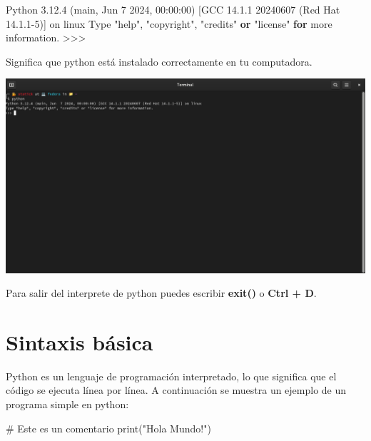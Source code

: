 \documentclass[
  a4paper,
  DIV=11,
  numbers=noendperiod,
  onepage,
  openany]{scrreprt}
\newenvironment{Shaded}{\begin{snugshade}}{\end{snugshade}}
\newcommand{\BuiltInTok}[1]{\textcolor[rgb]{0.00,0.23,0.31}{#1}}
\newcommand{\CommentTok}[1]{\textcolor[rgb]{0.37,0.37,0.37}{#1}}
\newcommand{\ControlFlowTok}[1]{\textcolor[rgb]{0.00,0.23,0.31}{\textbf{#1}}}
\newcommand{\DecValTok}[1]{\textcolor[rgb]{0.68,0.00,0.00}{#1}}
\newcommand{\FloatTok}[1]{\textcolor[rgb]{0.68,0.00,0.00}{#1}}
\newcommand{\KeywordTok}[1]{\textcolor[rgb]{0.00,0.23,0.31}{\textbf{#1}}}
\newcommand{\NormalTok}[1]{\textcolor[rgb]{0.00,0.23,0.31}{#1}}
\newcommand{\OperatorTok}[1]{\textcolor[rgb]{0.37,0.37,0.37}{#1}}
\newcommand{\StringTok}[1]{\textcolor[rgb]{0.13,0.47,0.30}{#1}}
\begin{document}
\begin{Shaded}
\begin{Highlighting}[]
\NormalTok{Python }\FloatTok{3.12.4}\NormalTok{ (main, Jun  }\DecValTok{7} \DecValTok{2024}\NormalTok{, }\DecValTok{00}\NormalTok{:}\DecValTok{00}\NormalTok{:}\DecValTok{00}\NormalTok{) [GCC }\FloatTok{14.1.1} \DecValTok{20240607}\NormalTok{ (Red Hat }\FloatTok{14.1.1}\OperatorTok{{-}}\DecValTok{5}\NormalTok{)] on linux}
\NormalTok{Type }\StringTok{"help"}\NormalTok{, }\StringTok{"copyright"}\NormalTok{, }\StringTok{"credits"} \KeywordTok{or} \StringTok{"license"} \ControlFlowTok{for}\NormalTok{ more information.}
\OperatorTok{\textgreater{}\textgreater{}\textgreater{}}
\end{Highlighting}
\end{Shaded}

Significa que python está instalado correctamente en tu computadora.

\includegraphics{unidades/unidad1/images/paste-1.png}

Para salir del interprete de python puedes escribir \textbf{exit()} o
\textbf{Ctrl + D}.

\section{Sintaxis básica}\label{sintaxis-buxe1sica}

Python es un lenguaje de programación interpretado, lo que significa que
el código se ejecuta línea por línea. A continuación se muestra un
ejemplo de un programa simple en python:

\begin{Shaded}
\begin{Highlighting}[]
\CommentTok{\# Este es un comentario}
\BuiltInTok{print}\NormalTok{(}\StringTok{"Hola Mundo!"}\NormalTok{)}
\end{Highlighting}
\end{Shaded}
\end{document}
